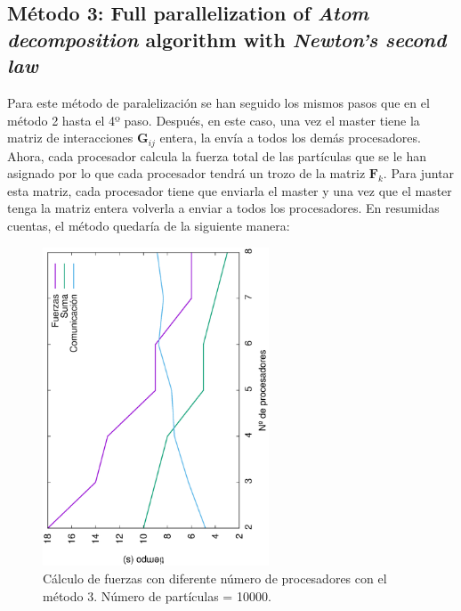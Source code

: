 \documentclass[onecolumn]{article}
\renewcommand{\vec}[1]{\mathbf{#1}}
\begin{document}
\subsection{Método 3: Full parallelization of \textit{Atom decomposition} algorithm with \textit{Newton's second law}}
Para este método de paralelización se han seguido los mismos pasos que en el método 2 hasta el 4º paso. Después, en este caso, una vez el master tiene la matriz de interacciones $\vec{G}_{ij}$ entera, la envía a todos los demás procesadores. Ahora, cada procesador calcula la fuerza total de las partículas que se le han asignado por lo que cada procesador tendrá un trozo de la matriz $\vec{F}_{k}$. Para juntar esta matriz, cada procesador tiene que enviarla el master y una vez que el master tenga la matriz entera volverla a enviar a todos los procesadores. En resumidas cuentas, el método quedaría de la siguiente manera:
\begin{figure}[h]
\begin{center}
\includegraphics[width=0.6\textwidth, angle=-90]{forces_proc2.eps}
\caption{Cálculo de fuerzas con diferente número de procesadores con el método 3. Número de partículas = 10000.}
\label{xabi_5}
\end{center}
\end{figure}
\end{document}
